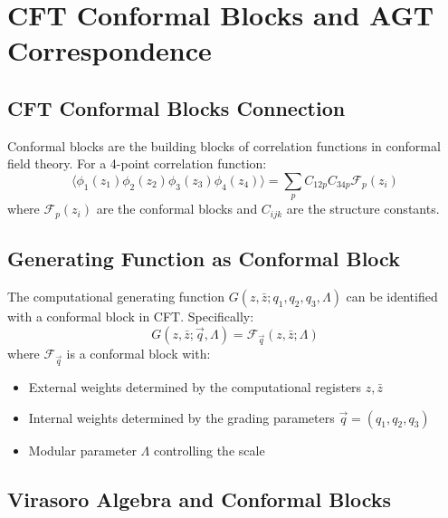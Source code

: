 
\section{CFT Conformal Blocks and AGT Correspondence}

\subsection{CFT Conformal Blocks Connection}

\begin{definition}
\label{def:conformal-blocks}
Conformal blocks are the building blocks of correlation functions in conformal field theory. For a 4-point correlation function:
\[
\langle \phi_1(z_1) \phi_2(z_2) \phi_3(z_3) \phi_4(z_4) \rangle = \sum_p C_{12p} C_{34p} \mathcal{F}_p(z_i)
\]
where $\mathcal{F}_p(z_i)$ are the conformal blocks and $C_{ijk}$ are the structure constants.
\end{definition}

\subsection{Generating Function as Conformal Block}

\begin{theorem}
\label{thm:generating-conformal}
The computational generating function $G(z, \bar{z}; q_1, q_2, q_3, \Lambda)$ can be identified with a conformal block in CFT. Specifically:
\[
G(z, \bar{z}; \vec{q}, \Lambda) = \mathcal{F}_{\vec{q}}(z, \bar{z}; \Lambda)
\]
where $\mathcal{F}_{\vec{q}}$ is a conformal block with:
\begin{itemize}
\item External weights determined by the computational registers $z, \bar{z}$
\item Internal weights determined by the grading parameters $\vec{q} = (q_1, q_2, q_3)$
\item Modular parameter $\Lambda$ controlling the scale
\end{itemize}
\end{theorem}

\subsection{Virasoro Algebra and Conformal Blocks}

